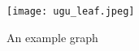 

\begin{figure}[h] %
	\centering %
	\texttt{[image: ugu\_leaf.jpeg]}
	\label{fig:ugu_leaf} %
	\caption{An example graph}
\end{figure}